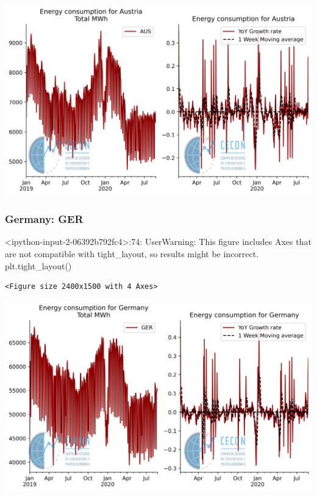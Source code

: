 \documentclass[11pt]{article}
\begin{document}
\begin{center}
\includegraphics[width=.9\linewidth]{obipy-resources/62e383af79e91b63c7fc98dd7fb55b3c3ececcb9/9ef112a5872cc34e81a6bb8ef5d1a8c7b5fddf8e.png}
\end{center}

\subsubsection{Germany: GER}
\label{sec:org3fba5dc}

<ipython-input-2-06392b792fc4>:74: UserWarning: This figure includes Axes that are not compatible with tight\_layout, so results might be incorrect.
  plt.tight\_layout()

\begin{verbatim}
<Figure size 2400x1500 with 4 Axes>
\end{verbatim}


\begin{center}
\includegraphics[width=.9\linewidth]{obipy-resources/62e383af79e91b63c7fc98dd7fb55b3c3ececcb9/94b114813ade8f5d4312e2e75f5b997a956c4a44.png}
\end{center}
\end{document}
